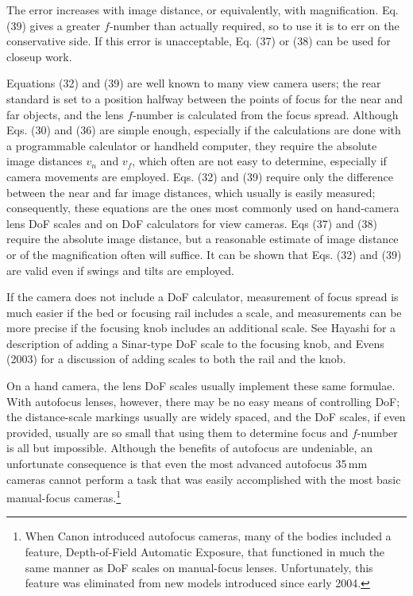 \documentclass[11pt, oneside]{scrartcl}   	%
\begin{document}
The error increases with image distance, or equivalently, with magnification. Eq. (39) gives a greater $f$-number than actually required, so to use it is to err on the conservative side. If this error is unacceptable, Eq. (37) or (38) can be used for closeup work.

Equations (32) and (39) are well known to many view camera users; the rear standard is set to a position halfway between the points of focus for the near and far objects, and the lens $f$-number is calculated from the focus spread. Although Eqs. (30) and (36) are simple enough, especially if the calculations are done with a programmable calculator or handheld computer, they require the absolute image distances $v_n$ and $v_f$, which often are not easy to determine, especially if camera movements are employed. Eqs. (32) and (39) require only the difference between the near and far image distances, which usually is easily measured; consequently, these equations are the ones most commonly used on hand-camera lens DoF scales and on DoF calculators for view cameras. Eqs (37) and (38) require the absolute image distance, but a reasonable estimate of image distance or of the magnification often will suffice. It can be shown that Eqs. (32) and (39) are valid even if swings and tilts are employed.

If the camera does not include a DoF calculator, measurement of focus spread is much easier if the bed or focusing rail includes a scale, and measurements can be more precise if the focusing knob includes an additional scale. See Hayashi for a description of adding a Sinar-type DoF scale to the focusing knob, and Evens (2003) for a discussion of adding scales to both the rail and the knob.

On a hand camera, the lens DoF scales usually implement these same formulae. With autofocus lenses, however, there may be no easy means of controlling DoF; the distance-scale markings usually are widely spaced, and the DoF scales, if even provided, usually are so small that using them to determine focus and $f$-number is all but impossible. Although the benefits of autofocus are undeniable, an unfortunate consequence is that even the most advanced autofocus 35\,mm cameras cannot perform a task that was easily accomplished with the most basic manual-focus cameras.\footnote{When Canon introduced autofocus cameras, many of the bodies included a feature, Depth-of-Field Automatic Exposure, that functioned in much the same manner as DoF scales on manual-focus lenses. Unfortunately, this feature was eliminated from new models introduced since early 2004.}
\end{document}
